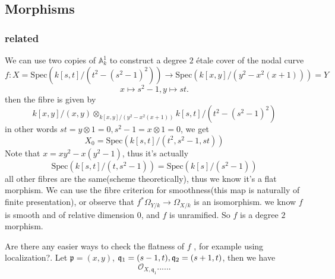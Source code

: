 \documentclass[../main.tex]{subfiles}
\begin{document}
\subsection{Morphisms}
\subsubsection{\Etale related}
\begin{example}
We can use two copies of $\mathbb{A}_{k}^{1}$ to construct a degree $2$ \'{e}tale cover of the nodal curve
$$f:X=\mathrm{Spec}(k[s,t]/(t^{2}-(s^{2}-1)^{2}))\rightarrow \mathrm{Spec}(k[x,y]/(y^{2}-x^{2}(x+1)))=Y$$
$$x\mapsto s^{2}-1, y\mapsto st.$$ then the fibre is given by 
$$k[x,y]/(x,y)\otimes_{k[x,y]/(y^{2}-x^{2}(x+1))}k[s,t]/(t^{2}-(s^{2}-1)^{2})$$
in other words $st=y\otimes 1=0, s^{2}-1=x\otimes 1=0$, we get 
$$X_{0}=\mathrm{Spec}(k[s,t]/(t^{2}, s^{2}-1,st))$$
Note that $x=xy^{2}-x(y^{2}-1)$, thus it's actually 
$$\mathrm{Spec}(k[s,t]/(t,s^{2}-1))=\mathrm{Spec}(k[s]/(s^{2}-1))$$
all other fibres are the same(scheme theoretically), thus we know it's a flat morphism. We can use the fibre criterion for smoothness(this map is naturally of finite presentation), or observe that $f^{*}\Omega_{Y/k}\rightarrow \Omega_{X/k}$ is an isomorphism. we know $f$ is smooth and of relative dimension $0$, and $f$ is unramified. So $f$ is a degree $2$ \etale morphism. 
\end{example}
\begin{remark}
Are there any easier ways to  check the flatness of $f$ , for example  using localization?. Let $\mathfrak{p}=(x,y)$, $\frak{q}_{1}=(s-1,t), \mathfrak{q}_{2}=(s+1, t)$, then we have 
$$\mathcal{O}_{X,\mathfrak{q}_{1}}......$$
\end{remark}
\end{document}
